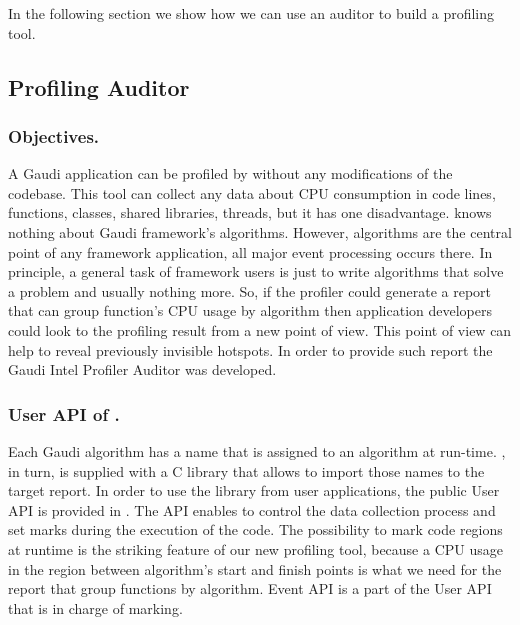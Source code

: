 \documentclass[a4paper]{jpconf}
\begin{document}
In the following section we show how we can use an auditor to build a profiling tool.

\subsection{Profiling Auditor}

\subsubsection{Objectives.}

A Gaudi application can be profiled by \amp  without any modifications of the codebase.  This tool can collect any data 
about CPU consumption in code lines, functions, classes, shared libraries, threads, but it has one disadvantage. 
\amp knows nothing about Gaudi framework's algorithms. However, algorithms are the central point of any framework 
application, all major event processing occurs there. In principle, a general task of framework users is just to write 
algorithms that solve a problem and usually nothing more. So, if the profiler could generate a report that can group 
function’s CPU usage by algorithm then application developers could look to the profiling result 
from a new point of view. This point of view can help to reveal previously invisible hotspots. 
In order to provide such report the Gaudi Intel Profiler Auditor was developed.

\subsubsection{User API of \iamp.}

Each Gaudi algorithm has a name that is assigned to an algorithm at run-time. \amp, in turn, is supplied with 
a C library that allows to import those names to the target report. In order to use the library from user applications, 
the public User API is provided in \amp. The API enables to control the data collection process and set marks during 
the execution of the code. The possibility to mark code regions at runtime is the striking feature 
of our new profiling tool, because a CPU usage in the region between algorithm’s start and finish points is what we 
need for the report that group functions by algorithm. 
Event API is a part of the User API  that is in charge of marking.
\end{document}
